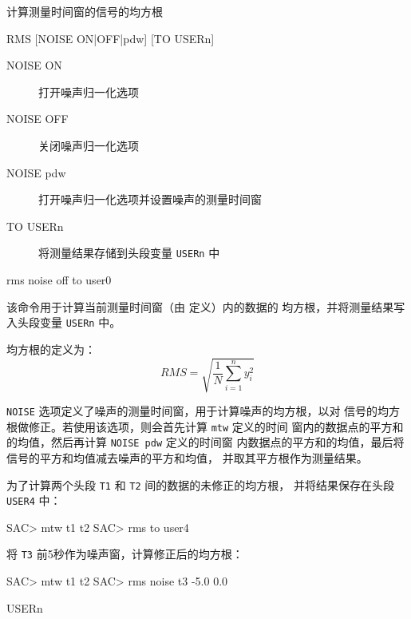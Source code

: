 \label{cmd:rms}

计算测量时间窗的信号的均方根

\begin{SACSTX}
RMS [NOISE ON|OFF|pdw] [TO USERn]
\end{SACSTX}

\begin{description}
\item [NOISE ON] 打开噪声归一化选项
\item [NOISE OFF] 关闭噪声归一化选项
\item [NOISE pdw] 打开噪声归一化选项并设置噪声的测量时间窗 
\item [TO USERn] 将测量结果存储到头段变量 \texttt{USERn} 中
\end{description}

\begin{SACDFT}
rms noise off to user0
\end{SACDFT}

该命令用于计算当前测量时间窗（由  定义）内的数据的
均方根，并将测量结果写入头段变量 \texttt{USERn} 中。

均方根的定义为：
\[
 RMS = \sqrt{\frac{1}{N} \sum_{i=1}^n y_i^2}
\]

\texttt{NOISE} 选项定义了噪声的测量时间窗，用于计算噪声的均方根，以对
信号的均方根做修正。若使用该选项，则会首先计算 \texttt{mtw} 定义的时间
窗内的数据点的平方和的均值，然后再计算 \texttt{NOISE pdw} 定义的时间窗
内数据点的平方和的均值，最后将信号的平方和均值减去噪声的平方和均值，
并取其平方根作为测量结果。

为了计算两个头段 \texttt{T1} 和 \texttt{T2} 间的数据的未修正的均方根，
并将结果保存在头段 \texttt{USER4} 中：
\begin{SACCode}
SAC> mtw t1 t2
SAC> rms to user4
\end{SACCode}

将 \texttt{T3} 前5秒作为噪声窗，计算修正后的均方根：
\begin{SACCode}
SAC> mtw t1 t2
SAC> rms noise t3 -5.0 0.0
\end{SACCode}

USERn
